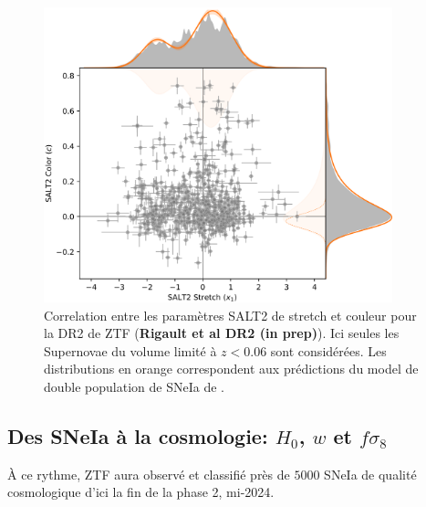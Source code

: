 \documentclass[../main/main.tex]{subfiles}
\begin{document}
\begin{figure}[h]
  \centering
  \includegraphics[width=0.9\textwidth]{../figures/02_ztf/ztfdr2stretchcolorcorrelation.png}
  \caption[Correlation entre les paramètres SALT2 de stretch et couleur
  (ZTF-DR2)]{ Correlation entre les paramètres SALT2 de stretch et
    couleur pour la DR2 de ZTF (\textbf{Rigault et al DR2 (in prep)}). Ici seules les Supernovae du
    volume limité à $z<0.06$ sont considérées. Les distributions en
    orange correspondent aux prédictions du model de double population
    de SNeIa de \citet{NoraNicolas21}.}
  \label{fig:ztfdr2saltcorr}
\end{figure}

\subsection{Des SNeIa à la cosmologie: $H_{0}$, $w$ et $f\sigma_{8}$} \label{sec:sniaztfcosmo}

À ce rythme, ZTF aura observé et classifié près de $5000$ SNeIa de
qualité cosmologique d'ici la
fin de la phase 2, mi-2024.
\end{document}
